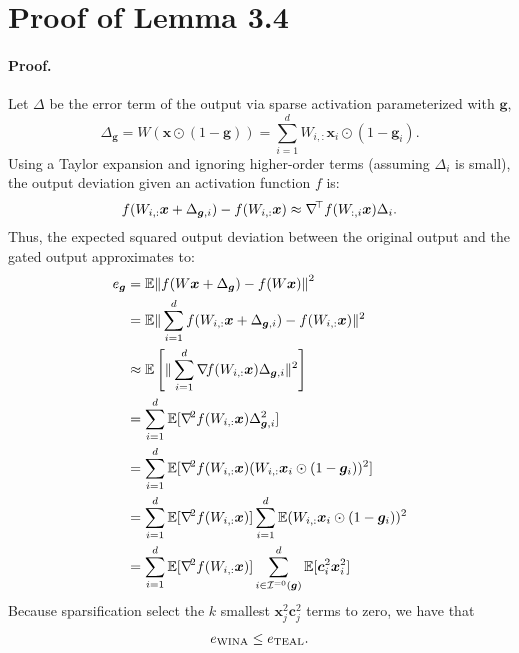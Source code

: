 \section{Proof of Lemma 3.4}

\paragraph{Proof.} 
Let $\Delta$ be the error term of the output via sparse activation parameterized with $\bm{g}$, 
$$
\Delta_{\bm{g}} = W(\bm{x} \odot (1 - \bm{g})) = \sum_{i=1}^{d} W_{i,:} \bm{x}_i \odot(1 - \bm{g}_{i}).
$$
Using a Taylor expansion and ignoring higher-order terms (assuming $ \Delta_{i}$ is small), the output deviation given an activation function $f$ is:
$$
f(W_{i,:}\bm{x} + \Delta_{\bm{g},i}) - f(W_{i,:}\bm{x}) \approx \Grad^\top f(W_{:,i}\bm{x}) \Delta_i.
$$
Thus, the expected squared output deviation between the original output and the gated output approximates to:
\begin{align*}
	e_{\bm{g}}&=\E{\left\|f(W\bm{x} + \Delta_{\bm{g}}) - f(W\bm{x})\right\|^2} \\
	&= \E{\|\sum_{i=1}^d f(W_{i,:}\bm{x} + \Delta_{\bm{g},i}) - f(W_{i,:}\bm{x})\|^2} \\
	&\approx \mathbb{E}\left[\|\sum_{i=1}^d \Grad f(W_{i,:}\bm{x})\Delta_{\bm{g}, i}\|^2\right]\\
	&= \sum_{i=1}^d \E [\Grad^2 f(W_{i,:}\bm{x})\Delta_{\bm{g}, i}^2]\\
	&=\sum_{i=1}^d \E [\Grad^2 f(W_{i,:}\bm{x})(W_{i,:} \bm{x}_i\odot (1 - \bm{g}_{i}))^2]\\
	&=\sum_{i=1}^d \E [\Grad^2 f(W_{i,:}\bm{x})] \sum_{i=1}^d\E (W_{i,:} \bm{x}_i\odot (1 - \bm{g}_{i}))^2\\
	&=\sum_{i=1}^d \E [\Grad^2 f(W_{i,:}\bm{x})] \sum_{i\in \mathcal{I}^{=0}(\bm{g})}^d\E[\bm{c}_i^2 \bm{x}_i^2]
\end{align*}
Because \algacro{} sparsification select the $k$ smallest $\bm{x}_j^2 \bm{c}_j^2$ terms to zero, we have that
\begin{align}
	e_\text{\algacro{}}\leq e_\text{TEAL}.
\end{align}
